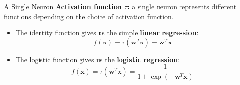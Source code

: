 \begin{vbframe}{A Single Neuron}
\textbf{Activation function $\tau$:} a single neuron %
 represents different functions %
 depending on the choice of activation function.
\vspace{.5cm}
\begin{itemize}
\item The identity function gives us the simple \textbf{linear regression}:
$$f(\mathbf{x}) = \tau(\mathbf{w}^T \mathbf{x}) = \mathbf{w}^T \mathbf{x}$$
\item The logistic function gives us the \textbf{logistic regression}:
$$f(\mathbf{x}) = \tau(\mathbf{w}^T \mathbf{x}) = \frac{1}{1 + \exp(-\mathbf{w}^T \mathbf{x})}$$
\end{itemize}
\end{vbframe}

